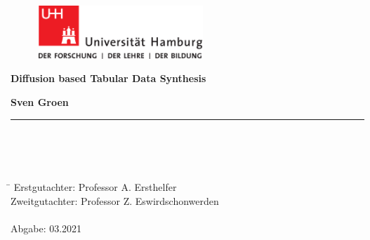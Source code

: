 \begin{titlepage}

  \setcounter{page}{-1}

	\begin{figure}[h]
		\begin{minipage}[b]{62mm}
			\includegraphics[width=62mm]{images/unilogo}
		\end{minipage}
		\hspace{4cm}
	\end{figure}

	\vfill
	
	\begin{center}
		\vspace{14mm}
		\noindent \textbf{\huge
		  Diffusion based Tabular Data Synthesis
		}
		\vspace{60mm}	
	\end{center}
	
	\vfill
	
	\noindent \textbf{Sven Groen} \\
	\noindent \rule{\textwidth}{0.4mm} 
	 \\
	 \\
	 \\
	\begin{tabbing}
	\hspace{8em} \=  \kill
	Erstgutachter: \> Professor A. Ersthelfer \\
	Zweitgutachter: \> Professor Z. Eswirdschonwerden \\
	~ \\
	Abgabe: 03.2021
	\end{tabbing}

\end{titlepage}

